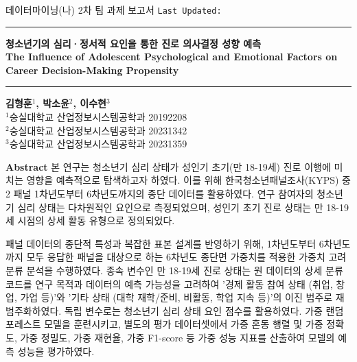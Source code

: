 \begin{center}
  \thispagestyle{empty}

  \noindent 데이터마이닝(나) 2차 팀 과제 보고서 \hfill \small \makeatletter\texttt{Last Updated: \@date}\makeatother \\
  \noindent\rule{\textwidth}{0.5pt}\par

  \vspace{2em}

  \huge \textbf{청소년기의 심리·정서적 요인을 통한 진로 의사결정 성향 예측} %
  \vspace{0.5em}
  \\
  \large \textbf{The Influence of Adolescent Psychological and Emotional Factors on Career Decision-Making Propensity} \\

  \vspace{1em}
  \noindent\rule{\textwidth}{0.5pt}\par

  \vspace{1em}

  \small \textbf{김형훈$^1$, 박소윤$^2$, 이수현$^3$}
  \vspace{0.5em}
  \\
  \small $^1$숭실대학교 산업정보시스템공학과 20192208 \\
  \small $^2$숭실대학교 산업정보시스템공학과 20231342 \\
  \small $^3$숭실대학교 산업정보시스템공학과 20231359

  \vspace{1em}

  \noindent\textbf{Abstract}
  본 연구는 청소년기 심리 상태가 성인기 초기(만 18-19세) 진로 이행에 미치는 영향을 예측적으로 탐색하고자 하였다. 이를 위해 한국청소년패널조사(KYPS) 중2 패널 1차년도부터 6차년도까지의 종단 데이터를 활용하였다. 연구 참여자의 청소년기 심리 상태는 다차원적인 요인으로 측정되었으며, 성인기 초기 진로 상태는 만 18-19세 시점의 상세 활동 유형으로 정의되었다.

  패널 데이터의 종단적 특성과 복잡한 표본 설계를 반영하기 위해, 1차년도부터 6차년도까지 모두 응답한 패널을 대상으로 하는 6차년도 종단면 가중치를 적용한 가중치 고려 분류 분석을 수행하였다. 종속 변수인 만 18-19세 진로 상태는 원 데이터의 상세 분류 코드를 연구 목적과 데이터의 예측 가능성을 고려하여 '경제 활동 참여 상태 (취업, 창업, 가업 등)'와 '기타 상태 (대학 재학/준비, 비활동, 학업 지속 등)'의 이진 범주로 재범주화하였다. 독립 변수로는 청소년기 심리 상태 요인 점수를 활용하였다. 가중 랜덤 포레스트 모델을 훈련시키고, 별도의 평가 데이터셋에서 가중 혼동 행렬 및 가중 정확도, 가중 정밀도, 가중 재현율, 가중 F1-score 등 가중 성능 지표를 산출하여 모델의 예측 성능을 평가하였다.


\end{center}
